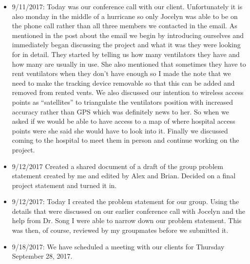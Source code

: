 \documentclass[12pt]{article}
\begin{document}
\begin{itemize}
			\item 9/11/2017: Today was our conference call with our client.  Unfortunately it is also monday in the middle of a hurricane so only Jocelyn was able to be on the phone call rather than all three members we contacted in the email.  As mentioned in the post about the email we begin by introducing ourselves and immediately began discussing the project and what it was they were looking for in detail.  They started by telling us how many ventilators they have and how many are usually in use.  She also mentioned that sometimes they have to rent ventilators when they don’t have enough so I made the note that we need to make the tracking device removable so that this can be added and removed from rented vents.  We also discussed our intention to wireless access points as “satellites” to triangulate the ventilators position with increased accuracy rather than GPS which was definitely news to her.  So when we asked if we would be able to have access to a map of where hospital access points were she said she would have to look into it.  Finally we discussed coming to the hospital to meet them in person and continue working on the project.
			\item 9/12/2017 Created a shared document of a draft of the group problem statement 
			created by me and edited by Alex and Brian. Decided on a final project statement and 
			turned it in.
			\item 9/12/2017: Today I created the problem statement for our group.  Using the details that were discussed on our earlier conference call with Jocelyn and the help from Dr. Song I were able to narrow down our problem statement.  This was then, of course, reviewed by my groupmates before we submitted it.
			\item 9/18/2017: We have scheduled a meeting with our clients for Thursday September 28, 2017.
		\end{itemize}
\end{document}
